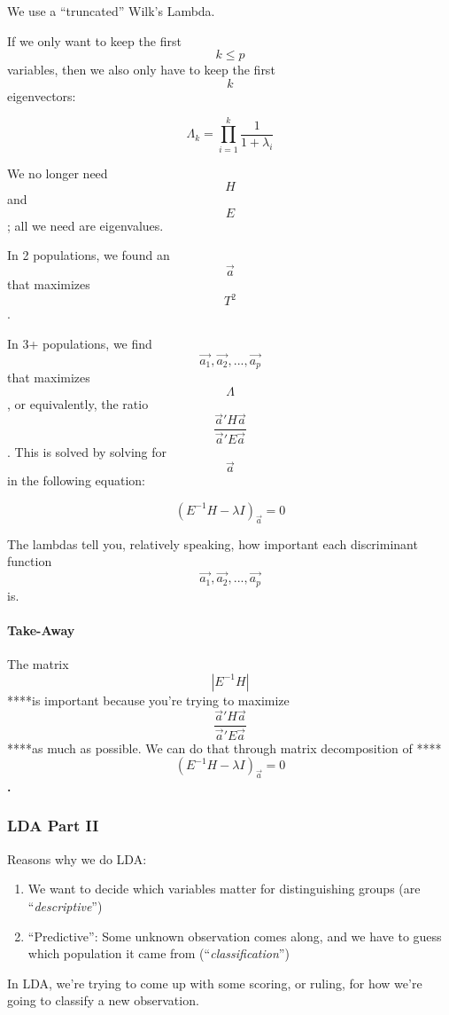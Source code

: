 \documentclass[]{article}
\providecommand{\tightlist}{%
  \setlength{\itemsep}{0pt}\setlength{\parskip}{0pt}}
\let\oldparagraph\paragraph
\renewcommand{\paragraph}[1]{\oldparagraph{#1}\mbox{}}
\begin{document}
We use a ``truncated'' Wilk's Lambda.

If we only want to keep the first \[k \le p\] variables, then we also
only have to keep the first \[k\] eigenvectors:

\[\Lambda_k =  \prod_{i = 1}^k \frac{1}{1 + \lambda_i}\]

We no longer need \[H\] and \[E\]; all we need are eigenvalues.

In 2 populations, we found an \[\vec{a}\] that maximizes \[T^2\].

In 3+ populations, we find \[\vec{a_1}, \vec{a_2}, ..., \vec{a_p}\] that
maximizes \[\Lambda\], or equivalently, the
ratio\[\frac{\vec{a}'H\vec{a}}{\vec{a}'E\vec{a}}\]. This is solved by
solving for \[\vec{a}\] in the following equation:

\[(E^{-1}H - \lambda I)_{\vec{a}} = 0\]

The lambdas tell you, relatively speaking, how important each
discriminant function \[\vec{a_1}, \vec{a_2}, ..., \vec{a_p}\] is.

\hypertarget{take-away}{%
\paragraph{Take-Away}\label{take-away}}

The matrix \[| E^{-1}H |\] ****is important because you're trying to
maximize \[\frac{\vec{a}'H\vec{a}}{\vec{a}'E\vec{a}}\] ****as much as
possible. We can do that through matrix decomposition of
****\[(E^{-1}H - \lambda I)_{\vec{a}} = 0\]\textbf{.}

\hypertarget{lda-part-ii}{%
\subsubsection{\texorpdfstring{\textbf{LDA Part
II}}{LDA Part II}}\label{lda-part-ii}}

Reasons why we do LDA:

\begin{enumerate}
\def\labelenumi{\arabic{enumi}.}
\tightlist
\item
  We want to decide which variables matter for distinguishing groups
  (are ``\emph{descriptive}'')
\item
  ``Predictive'': Some unknown observation comes along, and we have to
  guess which population it came from (``\emph{classification}'')
\end{enumerate}

In LDA, we're trying to come up with some scoring, or ruling, for how
we're going to classify a new observation.
\end{document}
